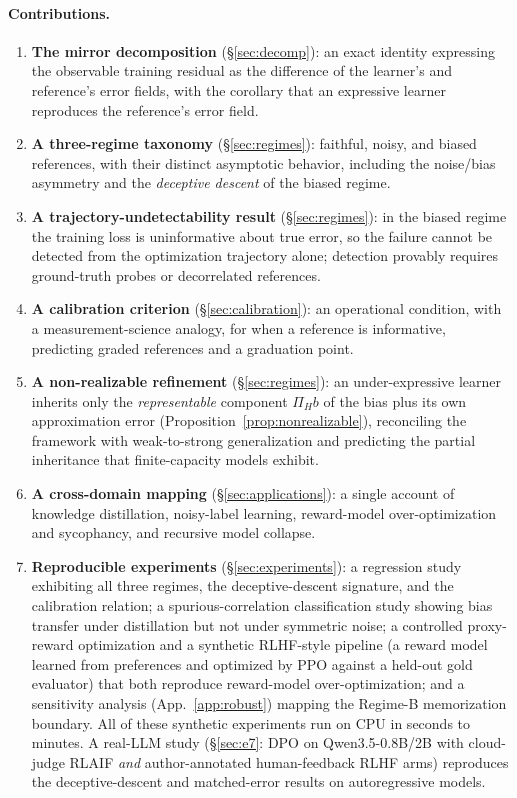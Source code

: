 \documentclass[10pt]{article} %
\theoremstyle{plain}
\theoremstyle{remark}
\begin{document}
\paragraph{Contributions.}
\begin{enumerate}[leftmargin=1.4em,itemsep=2pt,topsep=2pt]
\item \textbf{The mirror decomposition} (\S\ref{sec:decomp}): an exact identity expressing the observable training residual as the difference of the learner's and reference's error fields, with the corollary that an expressive learner reproduces the reference's error field.
\item \textbf{A three-regime taxonomy} (\S\ref{sec:regimes}): faithful, noisy, and biased references, with their distinct asymptotic behavior, including the noise/bias asymmetry and the \emph{deceptive descent} of the biased regime.
\item \textbf{A trajectory-undetectability result} (\S\ref{sec:regimes}): in the biased regime the training loss is uninformative about true error, so the failure cannot be detected from the optimization trajectory alone; detection provably requires ground-truth probes or decorrelated references.
\item \textbf{A calibration criterion} (\S\ref{sec:calibration}): an operational condition, with a measurement-science analogy, for when a reference is informative, predicting graded references and a graduation point.
\item \textbf{A non-realizable refinement} (\S\ref{sec:regimes}): an under-expressive learner inherits only the \emph{representable} component $\Pi_H b$ of the bias plus its own approximation error (Proposition~\ref{prop:nonrealizable}), reconciling the framework with weak-to-strong generalization and predicting the partial inheritance that finite-capacity models exhibit.
\item \textbf{A cross-domain mapping} (\S\ref{sec:applications}): a single account of knowledge distillation, noisy-label learning, reward-model over-optimization and sycophancy, and recursive model collapse.
\item \textbf{Reproducible experiments} (\S\ref{sec:experiments}): a regression study exhibiting all three regimes, the deceptive-descent signature, and the calibration relation; a spurious-correlation classification study showing bias transfer under distillation but not under symmetric noise; a controlled proxy-reward optimization and a synthetic RLHF-style pipeline (a reward model learned from preferences and optimized by PPO against a held-out gold evaluator) that both reproduce reward-model over-optimization; and a sensitivity analysis (App.~\ref{app:robust}) mapping the Regime-B memorization boundary. All of these synthetic experiments run on CPU in seconds to minutes. A real-LLM study (\S\ref{sec:e7}: DPO on Qwen3.5-0.8B/2B with cloud-judge RLAIF \emph{and} author-annotated human-feedback RLHF arms) reproduces the deceptive-descent and matched-error results on autoregressive models.
\end{enumerate}
\end{document}
